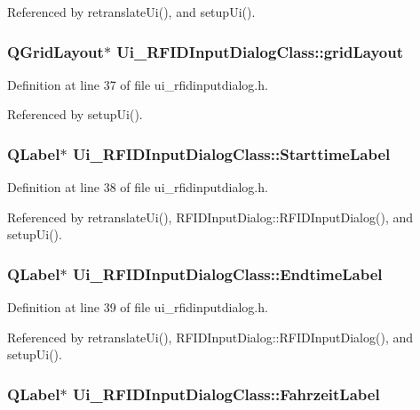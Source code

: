 Referenced by retranslateUi(), and setupUi().\hypertarget{class_ui___r_f_i_d_input_dialog_class_fda092bbf06f3c0fb2f16aba03eb8d2d}{
\subsubsection[gridLayout]{\setlength{\rightskip}{0pt plus 5cm}QGridLayout$\ast$ {\bf Ui\_\-RFIDInputDialogClass::gridLayout}}}
\label{class_ui___r_f_i_d_input_dialog_class_fda092bbf06f3c0fb2f16aba03eb8d2d}




Definition at line 37 of file ui\_\-rfidinputdialog.h.

Referenced by setupUi().\hypertarget{class_ui___r_f_i_d_input_dialog_class_fa81bfd32f474497e50bdc9a49603f94}{
\subsubsection[StarttimeLabel]{\setlength{\rightskip}{0pt plus 5cm}QLabel$\ast$ {\bf Ui\_\-RFIDInputDialogClass::StarttimeLabel}}}
\label{class_ui___r_f_i_d_input_dialog_class_fa81bfd32f474497e50bdc9a49603f94}




Definition at line 38 of file ui\_\-rfidinputdialog.h.

Referenced by retranslateUi(), RFIDInputDialog::RFIDInputDialog(), and setupUi().\hypertarget{class_ui___r_f_i_d_input_dialog_class_b8984751b020e9fa366f81334a159e9e}{
\subsubsection[EndtimeLabel]{\setlength{\rightskip}{0pt plus 5cm}QLabel$\ast$ {\bf Ui\_\-RFIDInputDialogClass::EndtimeLabel}}}
\label{class_ui___r_f_i_d_input_dialog_class_b8984751b020e9fa366f81334a159e9e}




Definition at line 39 of file ui\_\-rfidinputdialog.h.

Referenced by retranslateUi(), RFIDInputDialog::RFIDInputDialog(), and setupUi().\hypertarget{class_ui___r_f_i_d_input_dialog_class_0157542b72688ffeda45eb05d43e6e76}{
\subsubsection[FahrzeitLabel]{\setlength{\rightskip}{0pt plus 5cm}QLabel$\ast$ {\bf Ui\_\-RFIDInputDialogClass::FahrzeitLabel}}}
\label{class_ui___r_f_i_d_input_dialog_class_0157542b72688ffeda45eb05d43e6e76}




